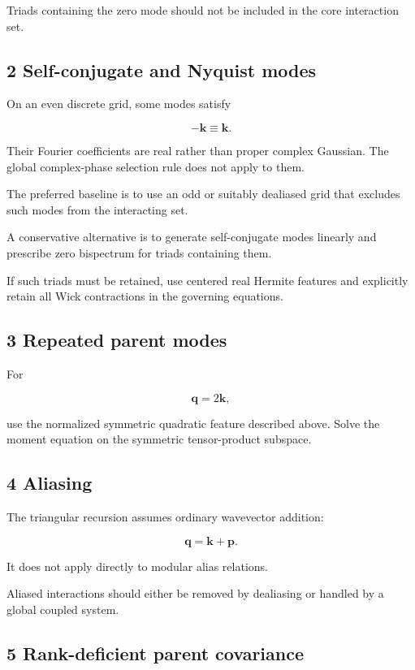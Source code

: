 \documentclass[
  11pt,
  a4paper,
]{article}
\begin{document}
Triads containing the zero mode should not be included in the core
interaction set.

\subsection{2 Self-conjugate and Nyquist
modes}\label{self-conjugate-and-nyquist-modes}

On an even discrete grid, some modes satisfy

\[
-\boldsymbol k\equiv\boldsymbol k.
\]

Their Fourier coefficients are real rather than proper complex Gaussian.
The global complex-phase selection rule does not apply to them.

The preferred baseline is to use an odd or suitably dealiased grid that
excludes such modes from the interacting set.

A conservative alternative is to generate self-conjugate modes linearly
and prescribe zero bispectrum for triads containing them.

If such triads must be retained, use centered real Hermite features and
explicitly retain all Wick contractions in the governing equations.

\subsection{3 Repeated parent modes}\label{repeated-parent-modes}

For

\[
\boldsymbol q=2\boldsymbol k,
\]

use the normalized symmetric quadratic feature described above. Solve
the moment equation on the symmetric tensor-product subspace.

\subsection{4 Aliasing}\label{aliasing}

The triangular recursion assumes ordinary wavevector addition:

\[
\boldsymbol q=\boldsymbol k+\boldsymbol p.
\]

It does not apply directly to modular alias relations.

Aliased interactions should either be removed by dealiasing or handled
by a global coupled system.

\subsection{5 Rank-deficient parent
covariance}\label{rank-deficient-parent-covariance}
\end{document}
